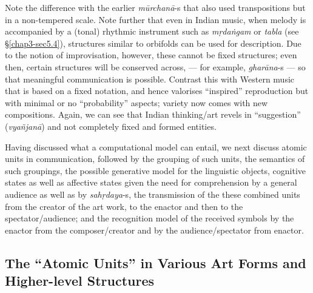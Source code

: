 Note the difference with the earlier \textsl{mūrchanā}-s that also used transpositions but in a non-tempered scale. Note further that even in Indian music, when melody is accompanied by a (tonal) rhythmic instrument such as \textsl{mṛdaṅgam} or \textsl{tabla}
 (see \S\ref{chap3-sec5.4}), structures similar to orbifolds can be used for description. Due to the notion of improvisation, however, these cannot be fixed structures; even then, certain structures will be conserved across, --- for example, \textsl{gharāna}-s --- so that meaningful communication is possible. Contrast this with Western music that is based on a fixed notation, and hence valorises “inspired” reproduction but with minimal or no “probability” aspects; variety now comes with new compositions. Again, we can see that Indian thinking/art revels in “suggestion” (\textsl{vyañjanā}) and not completely fixed and formed entities.

Having discussed what a computational model can entail, we next discuss atomic units in communication, followed by the grouping of such units, the semantics of such groupings, the possible generative model for the linguistic objects, cognitive states as well as affective states given the need for comprehension by a general audience as well as by \textsl{sahṛdaya}-s, the transmission of the these combined units from the creator of the art work, to the enactor and then to the spectator/audience; and the recognition model of the received symbols by the enactor from the composer/creator and by the audience/spectator from enactor.

\subsection{The “Atomic Units” in Various Art Forms and Higher-level Structures}\label{chap3-sec4.1}

